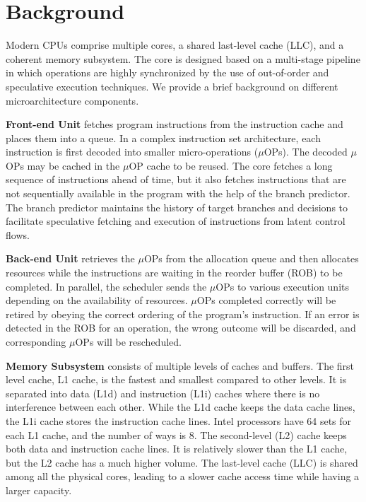 \section{Background}\label{sec:background}
Modern CPUs comprise multiple cores, a shared last-level cache (LLC), and a coherent memory subsystem. 
The core is designed based on a multi-stage pipeline in which operations are highly synchronized by the use of out-of-order and speculative execution techniques. We provide a brief background on different microarchitecture components.

\noindent\textbf{Front-end Unit} fetches program instructions from the instruction cache and places them into a queue. 
In a complex instruction set architecture, each instruction is first decoded into smaller micro-operations ($\mu$OPs). 
The decoded $\mu$OPs may be cached in the $\mu$OP cache to be reused. 
The core fetches a long sequence of instructions ahead of time, 
but it also fetches instructions that are not sequentially available in the program with the help of the branch predictor.
The branch predictor maintains the history of target branches and decisions to facilitate speculative fetching and execution of instructions from latent control flows.

\noindent\textbf{Back-end Unit} retrieves the $\mu$OPs from the allocation queue and then allocates resources while the instructions are waiting in the reorder buffer (ROB) to be completed.
In parallel, the scheduler sends the $\mu$OPs to various execution units depending on the availability of resources.
$\mu$OPs completed correctly will be retired by obeying the correct ordering of the program's instruction. 
If an error is detected in the ROB for an operation, the wrong outcome will be discarded, and corresponding $\mu$OPs will be rescheduled. 

\noindent\textbf{Memory Subsystem} consists of multiple levels of caches and buffers. The first level cache, L1 cache, is the fastest and smallest compared to other levels. 
It is separated into data (L1d) and instruction (L1i) caches where there is no interference between each other.
While the L1d cache keeps the data cache lines, the L1i cache stores the instruction cache lines. Intel processors have 64 sets for each L1 cache, and the number of ways is 8.
The second-level (L2) cache keeps both data and instruction cache lines. 
It is relatively slower than the L1 cache, but the L2 cache has a much higher volume. The last-level cache (LLC) is shared among all the physical cores, leading to a slower cache access time while having a larger capacity.


